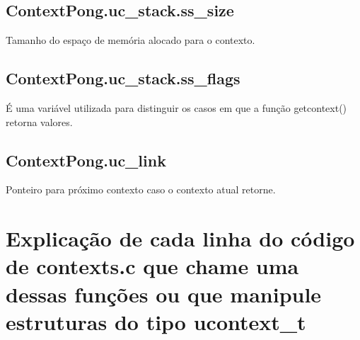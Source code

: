 \documentclass[12pt]{article}
\begin{document}
\subsection{ContextPong.uc\_stack.ss\_size}
Tamanho do espaço de memória alocado para o contexto.


\subsection{ContextPong.uc\_stack.ss\_flags}
É uma variável utilizada para distinguir os casos em que a função getcontext() retorna valores.


\subsection{ContextPong.uc\_link}
Ponteiro para próximo contexto caso o contexto atual retorne. 


\section{Explicação de cada linha do código de contexts.c que chame uma dessas funções ou que manipule estruturas do tipo ucontext\_t}
\end{document}
